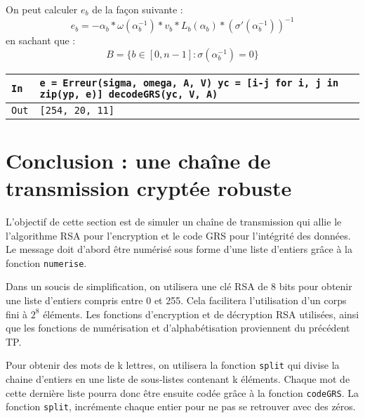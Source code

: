 \documentclass[titlepage]{article}
\begin{document}
        On peut calculer $e_b$ de la façon suivante : 
        \[e_b = -\alpha_b*\omega(\alpha_b^{-1})*v_b*L_b(\alpha_b)*(\sigma'(\alpha_b^{-1}))^{-1}\]
        en sachant que : 
        \[B = \{b \in [0,n-1] : \sigma(\alpha_b^{-1}) = 0 \}\]

        

        \begin{tabularx}{12cm}{|p{0.60cm}|X|}
            \hline
            \rowcolor{gray}
            \texttt{In}
            & 
            \texttt{e = Erreur(sigma, omega, A, V)\newline
            yc = [i-j for i, j in zip(yp, e)]\newline
            decodeGRS(yc, V, A)}
            \\
            \hline
            \texttt{Out}
            &
            \texttt{[254, 20, 11]}
            \\
            \hline
        \end{tabularx}
        \bigbreak

    \section{Conclusion : une chaîne de transmission cryptée robuste}
    L'objectif de cette section est de simuler un chaîne de transmission qui allie le l'algorithme RSA pour l'encryption et le code GRS pour l'intégrité des données.
    Le message doit d'abord être numérisé sous forme d'une liste d'entiers grâce à la fonction \texttt{numerise}.
    
    Dans un soucis de simplification, on utilisera une clé RSA de 8 bits pour obtenir une liste d'entiers compris entre 0 et 255. Cela facilitera l'utilisation d'un corps fini à $2^8$ éléments.
    Les fonctions d'encryption et de décryption RSA utilisées, ainsi que les fonctions de numérisation et d'alphabétisation proviennent du précédent TP.
    
    Pour obtenir des mots de k lettres, on utilisera la fonction \texttt{split} qui divise la chaine d'entiers en une liste de sous-listes contenant k éléments. 
    Chaque mot de cette dernière liste pourra donc être ensuite codée grâce à la fonction \texttt{codeGRS}.
    La fonction \texttt{split}, incrémente chaque entier pour ne pas se retrouver avec des zéros.

    
\end{document}
